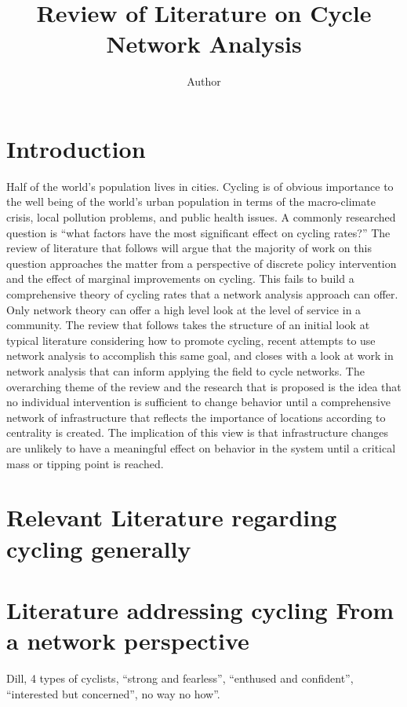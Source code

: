 \documentclass[11pt]{article} %
\title{\vspace{-3.0cm}Review of Literature on Cycle Network Analysis}
\author{Author}
\begin{document}
\maketitle


\section{Introduction}

Half of the world's population lives in cities. Cycling is of obvious importance to the well being of the world's  urban population in terms of the macro-climate crisis, local pollution problems, and public health issues. A commonly researched question is ``what factors have the most significant effect on cycling rates?'' The review of literature that follows will argue that the majority of work on this question approaches the matter from a perspective of discrete policy intervention and the effect of marginal improvements on cycling. This fails to build a comprehensive theory of cycling rates that a network analysis approach can offer. Only network theory can offer a high level look at the level of service in a community. The review that follows takes the structure of an initial look at typical literature considering how to promote cycling, recent attempts to use network analysis to accomplish this same goal, and closes with a look at work in network analysis that can inform applying the field to cycle networks. The overarching theme of the review and the research that is proposed is the idea that no individual intervention is sufficient to change behavior until a comprehensive network of infrastructure that reflects the importance of locations according to centrality is created. The implication of this view is that infrastructure changes are unlikely to have a meaningful effect on behavior in the system until a critical mass or tipping point is reached. 

\section{Relevant Literature regarding cycling generally}




\section{Literature addressing cycling From a network perspective}

Dill, 4 types of cyclists, ``strong and fearless'', ``enthused and confident'', ``interested but concerned'', no way no how''.   \cite{dill2013four}
\end{document}
